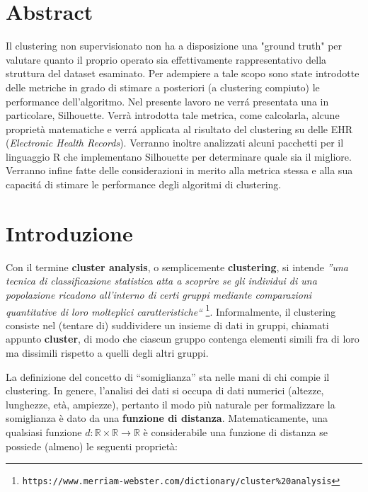 \documentclass[a4paper, 12pt]{report}
\begin{document}
	\tableofcontents
	\thispagestyle{empty}

	\listoffigures
	\thispagestyle{empty}
	\clearpage

	\chapter*{Abstract}
	\thispagestyle{empty}

		Il clustering non supervisionato non ha a disposizione una "ground
		truth" per valutare quanto il proprio operato sia effettivamente
		rappresentativo della struttura del dataset esaminato. Per adempiere
		a tale scopo sono state introdotte delle metriche in grado di stimare
		a posteriori (a clustering compiuto) le performance dell'algoritmo.
		Nel presente lavoro ne verrá presentata una in particolare, Silhouette.
		Verrà introdotta tale metrica, come calcolarla, alcune proprietà
		matematiche e verrá applicata al risultato del clustering su delle
		EHR (\textit{Electronic Health Records}). Verranno inoltre analizzati
		alcuni pacchetti per il linguaggio R che implementano Silhouette per
		determinare quale sia il migliore. Verranno infine fatte delle
		considerazioni in merito alla metrica stessa e alla sua capacitá
		di stimare le performance degli algoritmi di clustering.

	\chapter{Introduzione}
	\setcounter{page}{1}

		Con il termine \textbf{cluster analysis}, o semplicemente
		\textbf{clustering}, si intende \emph{''una tecnica di
		classificazione statistica atta a scoprire se gli individui
		di una popolazione ricadono all'interno di certi gruppi mediante
		comparazioni quantitative di loro molteplici caratteristiche``}
		\footnote{\texttt{https://www.merriam-webster.com/dictionary/cluster\%20analysis}}.
		Informalmente, il clustering consiste nel (tentare di) suddividere
		un insieme di dati in gruppi, chiamati appunto \textbf{cluster},
		di modo che ciascun gruppo contenga elementi simili fra di loro
		ma dissimili rispetto a quelli degli altri gruppi.

		La definizione del concetto di ``somiglianza'' sta nelle mani di
		chi compie il clustering. In genere, l'analisi dei dati si occupa
		di dati numerici (altezze, lunghezze, età, ampiezze), pertanto il
		modo più naturale per formalizzare la somiglianza è dato da una
		\textbf{funzione di distanza}. Matematicamente, una qualsiasi
		funzione $d: \mathbb{R} \times \mathbb{R} \rightarrow \mathbb{R}$
		è considerabile una funzione di distanza se possiede (almeno) le
		seguenti proprietà:
\end{document}
